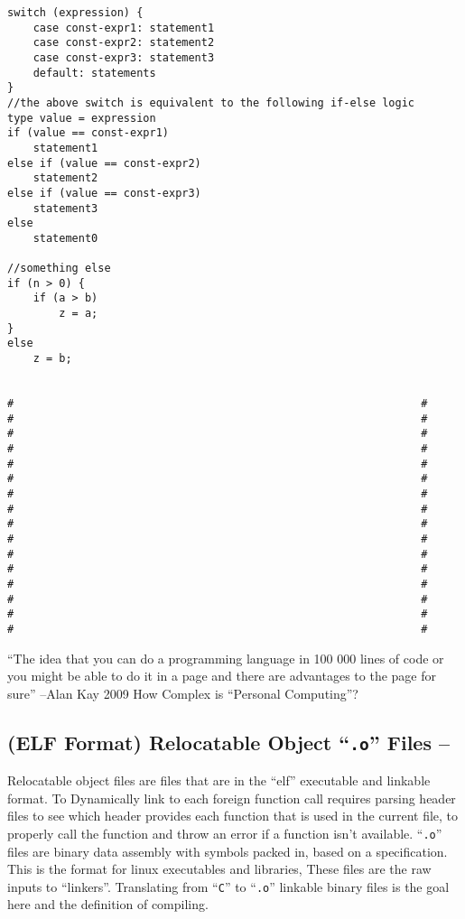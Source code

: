 \begin{verbatim}
switch (expression) {
    case const-expr1: statement1
    case const-expr2: statement2
    case const-expr3: statement3
    default: statements
}
//the above switch is equivalent to the following if-else logic
type value = expression
if (value == const-expr1)
    statement1
else if (value == const-expr2)
    statement2
else if (value == const-expr3)
    statement3
else
    statement0

//something else
if (n > 0) {
    if (a > b)
        z = a;
}
else
    z = b;


#                                                               #
#                                                               #
#                                                               #
#                                                               #
#                                                               #
#                                                               #
#                                                               #
#                                                               #
#                                                               #
#                                                               #
#                                                               #
#                                                               #
#                                                               #
#                                                               #
#                                                               #
#                                                               #
\end{verbatim}

``The idea that you can do a programming language in 100 000 lines of
code or you might be able to do it in a page and there are advantages to
the page for sure'' --Alan Kay 2009 How Complex is ``Personal
Computing''?

\hypertarget{elf-format-relocatable-object-.o-files}{%
\subsection{\texorpdfstring{(ELF Format) Relocatable Object
``\texttt{.o}'' Files
--}{(ELF Format) Relocatable Object ``.o'' Files --}}\label{elf-format-relocatable-object-.o-files}}

Relocatable object files are files that are in the ``elf'' executable
and linkable format. To Dynamically link to each foreign function call
requires parsing header files to see which header provides each function
that is used in the current file, to properly call the function and
throw an error if a function isn't available. ``\texttt{.o}'' files are
binary data assembly with symbols packed in, based on a specification.
This is the format for linux executables and libraries, These files are
the raw inputs to ``linkers''. Translating from ``\texttt{C}'' to
``\texttt{.o}'' linkable binary files is the goal here and the
definition of compiling.


